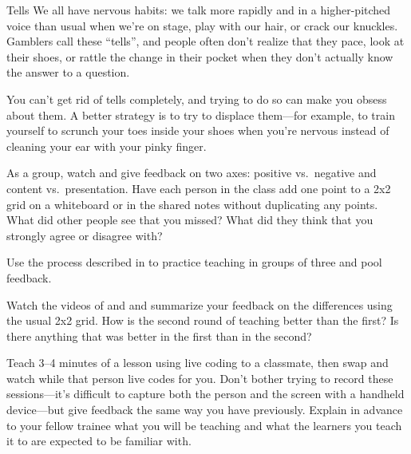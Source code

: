 \begin{aside}{Tells}
  We all have nervous habits:
  we talk more rapidly and in a higher-pitched voice than usual when we're on stage,
  play with our hair,
  or crack our knuckles.
  Gamblers call these ``tells'',
  and people often don't realize that they pace,
  look at their shoes,
  or rattle the change in their pocket
  when they don't actually know the answer to a question.

  You can't get rid of tells completely,
  and trying to do so can make you obsess about them.
  A better strategy is to try to displace them---for example,
  to train yourself to scrunch your toes inside your shoes when you're nervous
  instead of cleaning your ear with your pinky finger.
\end{aside}



As a group,
watch 
and give feedback on two axes:
positive vs.\ negative and content vs.\ presentation.
Have each person in the class add one point to a 2x2 grid on a whiteboard or in the shared notes
without duplicating any points.
What did other people see that you missed?
What did they think that you strongly agree or disagree with?


Use the process described in 
to practice teaching in groups of three
and pool feedback.


Watch the videos of 
and 
and summarize your feedback on the differences using the usual 2x2 grid.
How is the second round of teaching better than the first?
Is there anything that was better in the first than in the second?


Teach 3--4 minutes of a lesson using live coding to a classmate,
then swap and watch while that person live codes for you.
Don't bother trying to record these sessions---it's difficult to capture
both the person and the screen with a handheld device---but
give feedback the same way you have previously.
Explain in advance to your fellow trainee what you will be teaching
and what the learners you teach it to are expected to be familiar with.

